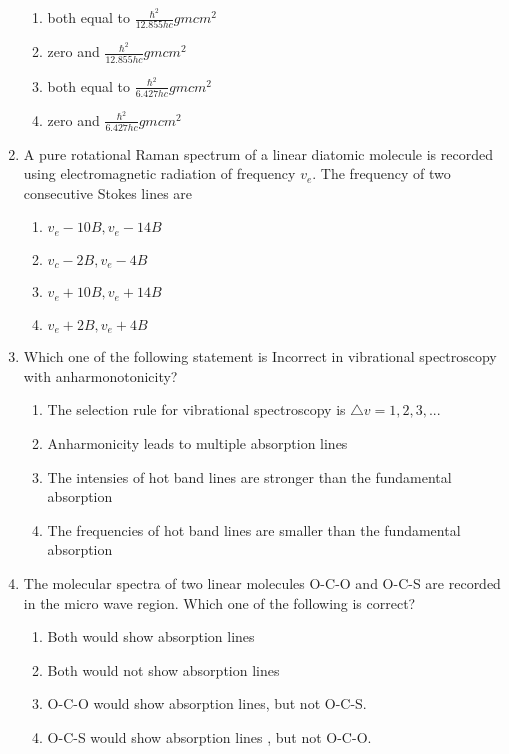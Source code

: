 \documentclass[journal]{IEEEtran}
\begin{document}
\begin{enumerate}
            \begin{enumerate}
              \item  both equal to $\frac{\hbar^{2}}{12.855 h c} {gm} {cm}^{2}$
              \item zero and $\frac{\hbar^{2}}{12.855 {hc}} {gm} {cm}^{2}$
              \item both equal to $\frac{\hbar^{2}}{6.427 h c} {gm} {cm}^{2}$
              \item zero and $\frac{\hbar^{2}}{6.427 h c} {gm} {cm}^{2}$
            \end{enumerate}
       
        \item A pure rotational Raman spectrum of a linear diatomic molecule is recorded using electromagnetic radiation of frequency $v_{e}$. The frequency of two consecutive Stokes lines are
        \begin{multicols}{1}
            \begin{enumerate}
              \item  $v_{e}-10 B, v_{e}-14 B$
              \item  $v_{c}-2 B,  v_{e}-4 B$
              \item $v_{e}+10 B,  v_{e}+14 B$
              \item $v_{e}+2 B,  v_{e}+4 B$
            \end{enumerate}
        \end{multicols}
        \item Which one of the following statement is Incorrect in  vibrational spectroscopy with anharmonotonicity?
        
            \begin{enumerate}
              \item The selection rule for vibrational spectroscopy is $\triangle v=1,2,3,...$
              \item Anharmonicity leads to multiple absorption lines
              \item The intensies of hot band lines are stronger than the fundamental absorption 
              \item The frequencies of hot band lines are smaller than the fundamental absorption 
            \end{enumerate}
        
        \item  The molecular spectra of two linear molecules O-C-O and O-C-S are recorded in the micro wave region. Which one of the following is correct?
        
        \begin{enumerate}
        \item Both would show absorption lines 
        \item Both would not show absorption lines
          \item  O-C-O would show absorption lines, but not O-C-S.
          \item  O-C-S would show absorption lines , but not O-C-O.
          \end{enumerate}
        

        
 \end{enumerate}
\end{document}
